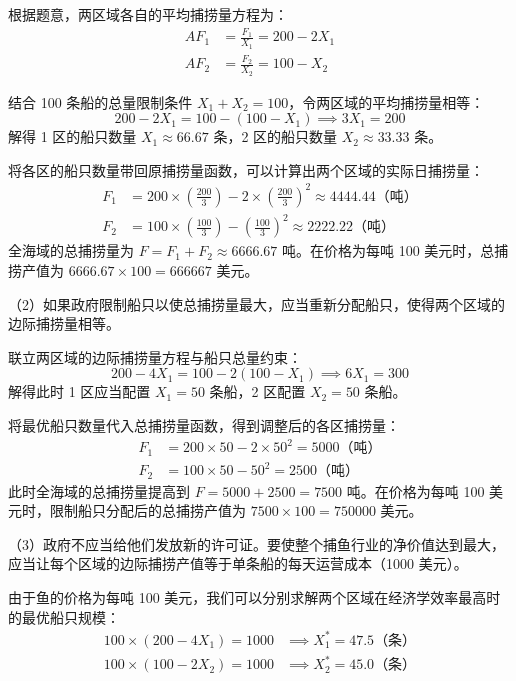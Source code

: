 \begin{enumerate}[label=\textbf{\arabic*.}, leftmargin=*]
		根据题意，两区域各自的平均捕捞量方程为：
		\[
		\begin{aligned}
			AF_1 &= \frac{F_1}{X_1} = 200 - 2X_1 \\
			AF_2 &= \frac{F_2}{X_2} = 100 - X_2
		\end{aligned}
		\]
		
		结合 100 条船的总量限制条件 $X_1 + X_2 = 100$，令两区域的平均捕捞量相等：
		\[
		200 - 2X_1 = 100 - (100 - X_1) \implies 3X_1 = 200
		\]
		解得 1 区的船只数量 $X_1 \approx 66.67$ 条，2 区的船只数量 $X_2 \approx 33.33$ 条。
		
		将各区的船只数量带回原捕捞量函数，可以计算出两个区域的实际日捕捞量：
		\[
		\begin{aligned}
			F_1 &= 200 \times \left(\frac{200}{3}\right) - 2 \times \left(\frac{200}{3}\right)^2 \approx 4444.44 \text{（吨）} \\
			F_2 &= 100 \times \left(\frac{100}{3}\right) - \left(\frac{100}{3}\right)^2 \approx 2222.22 \text{（吨）}
		\end{aligned}
		\]
		全海域的总捕捞量为 $F = F_1 + F_2 \approx 6666.67$ 吨。在价格为每吨 100 美元时，总捕捞产值为 $6666.67 \times 100 = 666667$ 美元。
		
		（2）如果政府限制船只以使总捕捞量最大，应当重新分配船只，使得两个区域的边际捕捞量相等。
		
		联立两区域的边际捕捞量方程与船只总量约束：
		\[
		200 - 4X_1 = 100 - 2(100 - X_1) \implies 6X_1 = 300
		\]
		解得此时 1 区应当配置 $X_1 = 50$ 条船，2 区配置 $X_2 = 50$ 条船。
		
		将最优船只数量代入总捕捞量函数，得到调整后的各区捕捞量：
		\[
		\begin{aligned}
			F_1 &= 200 \times 50 - 2 \times 50^2 = 5000 \text{（吨）} \\
			F_2 &= 100 \times 50 - 50^2 = 2500 \text{（吨）}
		\end{aligned}
		\]
		此时全海域的总捕捞量提高到 $F = 5000 + 2500 = 7500$ 吨。在价格为每吨 100 美元时，限制船只分配后的总捕捞产值为 $7500 \times 100 = 750000$ 美元。
		
		（3）政府不应当给他们发放新的许可证。要使整个捕鱼行业的净价值达到最大，应当让每个区域的边际捕捞产值等于单条船的每天运营成本（1000 美元）。
		
		由于鱼的价格为每吨 100 美元，我们可以分别求解两个区域在经济学效率最高时的最优船只规模：
		\[
		\begin{aligned}
			100 \times (200 - 4X_1) = 1000 &\implies X_1^* = 47.5 \text{（条）} \\
			100 \times (100 - 2X_2) = 1000 &\implies X_2^* = 45.0 \text{（条）}
		\end{aligned}
		\]
		

\end{enumerate}
